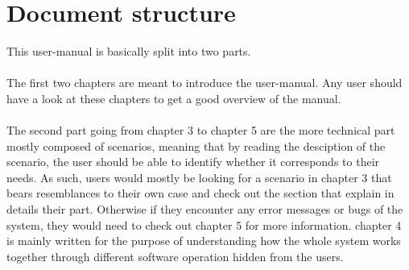 \section{Document structure}  
This user-manual is basically split into two parts. \\\\
The first two chapters are meant to introduce the user-manual. Any user should
have a look at these chapters to get a good overview of the manual. \\\\
The second part going from chapter 3 to chapter 5 are the more technical
part mostly composed of scenarios, meaning that by reading the desciption of the
scenario, the user should be able to identify whether it corresponds to their
needs. As such, users would mostly be looking for a scenario in chapter 3 that
bears resemblances to their own case and check out the section that explain in
details their part. Otherwise if they encounter any error messages or bugs of
the system, they would need to check out chapter 5 for more information.
chapter 4 is mainly written for the purpose of understanding how the whole
system works together through different software operation hidden from the
users.





